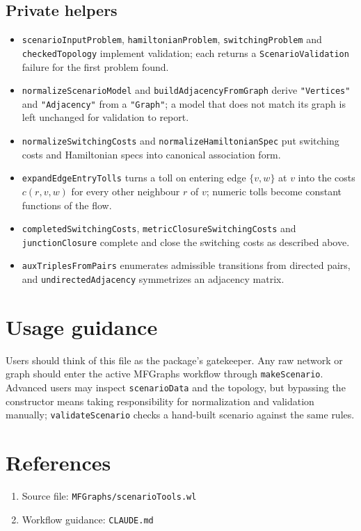 \documentclass[11pt]{article}
\begin{document}
\subsection*{Private helpers}

\begin{itemize}
\item \texttt{scenarioInputProblem}, \texttt{hamiltonianProblem}, \texttt{switchingProblem} and \texttt{checkedTopology} implement validation; each returns a \texttt{ScenarioValidation} failure for the first problem found.
\item \texttt{normalizeScenarioModel} and \texttt{buildAdjacencyFromGraph} derive \texttt{"Vertices"} and \texttt{"Adjacency"} from a \texttt{"Graph"}; a model that does not match its graph is left unchanged for validation to report.
\item \texttt{normalizeSwitchingCosts} and \texttt{normalizeHamiltonianSpec} put switching costs and Hamiltonian specs into canonical association form.
\item \texttt{expandEdgeEntryTolls} turns a toll on entering edge $\{v,w\}$ at $v$ into the costs $c(r,v,w)$ for every other neighbour $r$ of $v$; numeric tolls become constant functions of the flow.
\item \texttt{completedSwitchingCosts}, \texttt{metricClosureSwitchingCosts} and \texttt{junctionClosure} complete and close the switching costs as described above.
\item \texttt{auxTriplesFromPairs} enumerates admissible transitions from directed pairs, and \texttt{undirectedAdjacency} symmetrizes an adjacency matrix.
\end{itemize}

\section{Usage guidance}

Users should think of this file as the package's gatekeeper. Any raw network or graph should enter the active MFGraphs workflow through \texttt{makeScenario}. Advanced users may inspect \texttt{scenarioData} and the topology, but bypassing the constructor means taking responsibility for normalization and validation manually; \texttt{validateScenario} checks a hand-built scenario against the same rules.

\section*{References}

\begin{enumerate}
\item Source file: \texttt{MFGraphs/scenarioTools.wl}
\item Workflow guidance: \texttt{CLAUDE.md}
\end{enumerate}
\end{document}
